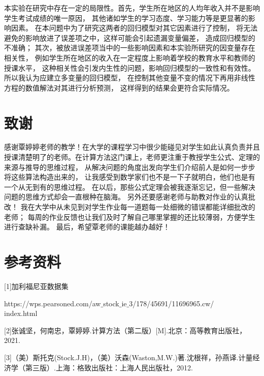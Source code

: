 \documentclass[12pt,a4paper]{article}
\begin{document}
本实验在研究中存在一定的局限性。首先，学生所在地区的人均年收入并不是影响学生考试成绩的唯一原因，
其他诸如学生的学习态度、学习能力等是更显著的影响因素。
在本问题中为了研究这两者的回归模型对其它因素进行了控制，
将无法避免的影响放进了误差项之中，这样可能会引起遗漏变量偏差，
造成回归模型的不准确；
其次，被放进误差项当中的一些影响因素和本实验所研究的因变量存在相关性，
例如学生所在地区的收入在一定程度上影响着学校的教育水平和教师的授课水平，
这种相关性会引发内生性的问题，影响回归模型的一致性和有效性。
所以我认为应建立多变量的回归模型，
在控制其他变量不变的情况下再用非线性方程的数值解法对其进行分析预测，
这样得到的结果会更符合实际情况。

\section{致谢}
感谢覃婷婷老师的教学！在大学的课程学习中很少能碰见对学生如此认真负责并且
授课清楚明了的老师。在计算方法这门课上，老师更注重于教授学生公式、定理的来源与推导的思维过程，
从解决问题的角度出发向学生们介绍前人是如何一步步将这些算法构造出来的，
让我感受到数学家们也不是一下子就明白，他们也是有一个从无到有的思维过程。
在以后，那些公式定理会被我逐渐忘记，但一些解决问题的思维方式却会一直根种在脑海。
另外还要感谢老师与助教对作业的认真批改！
我在大学中从未见到对学生作业每一道题每一处细微的错误都能详细批改的老师；
每周的作业反馈也让我们及时了解自己哪里掌握的还比较薄弱，方便学生进行查缺补漏。
最后，希望覃老师的课能越办越好！

\section{参考资料}
[1]加利福尼亚数据集

https://wps.pearsoned.com/aw$\_$stock$\_$ie$\_$3/178/45691/11696965.cw/\\
index.html

[2]张诚坚，何南忠，覃婷婷.计算方法（第二版）[M].北京：高等教育出版社，2021.

[3]（美）斯托克(Stock.J.H)，（美）沃森(Waston,M.W.)著.沈根祥，孙燕译.计量经济学（第三版）.上海：格致出版社：上海人民出版社，2012.
\end{document}
